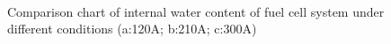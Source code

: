 \begin{figure}[ht]
	\centering
	\\
	\caption{Comparison chart of internal water content of fuel cell system under different conditions (a:120A; b:210A; c:300A)}
	\label{fig:figure8}
\end{figure}

